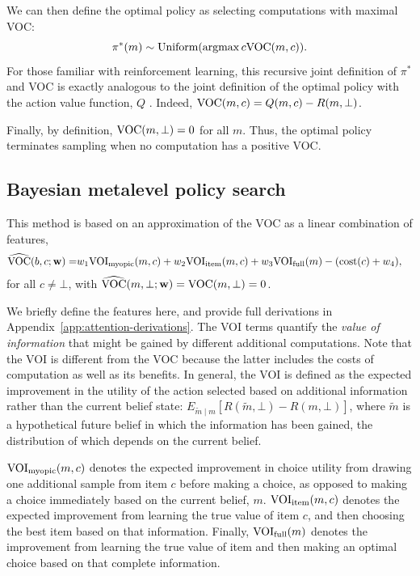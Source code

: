 We can then define the optimal policy as selecting computations with maximal VOC:
$$
\pi^*(m) \sim \text{Uniform}(\operatorname*{argmax}{c} \text{VOC}(m, c)).
$$
For those familiar with reinforcement learning, this recursive joint definition of $\pi^*$ and VOC is exactly analogous to the joint definition of the optimal policy with the action value function, $Q$ \citep{sutton2018reinforcement}. Indeed, $\text{VOC}(m, c) = Q(m, c) - R(m, \bot)$. 

Finally, by definition, $\text{VOC}(m,\bot)=0$ for all $m$. Thus, the optimal policy terminates sampling when no computation has a positive VOC.

\subsection{Bayesian metalevel policy search}\label{sec:BMPS}

This method is based on an approximation of the VOC as a linear combination of features,
\begin{equation}\label{eq:vochat}
  \begin{aligned}
    \widehat{\text{VOC}}(b, c; \mathbf{w}) =& w_{1}\text{VOI}_\text{myopic}(m,c)+w_{2}\text{VOI}_\text{item}(m,c) +
     w_{3}\text{VOI}_\text{full}(m) -(\text{cost}(c)+w_{4}),
  \end{aligned}
\end{equation}
for all $c\neq\bot$, with $\widehat{\text{VOC}}(m, \bot; \mathbf{w}) = \text{VOC}(m,\bot)=0$.

We briefly define the features here, and provide full derivations in Appendix~\ref{app:attention-derivations}. The VOI terms quantify the \textit{value of information} \citep{howard1966information} that might be gained by different additional computations. Note that the VOI is different from the VOC because the latter includes the costs of computation as well as its benefits. In general, the VOI is defined as the expected improvement in the utility of the action selected based on additional information rather than the current belief state: $E_{\tilde{m} \mid m}[R(\tilde{m}, \bot) - R(m, \bot)]$, where $\tilde{m}$ is a hypothetical future belief in which the information has been gained, the distribution of which depends on the current belief.

$\text{VOI}_\text{myopic}(m,c)$ denotes the expected improvement in choice utility from drawing one additional sample from item $c$ before making a choice, as opposed to making a choice immediately based on the current belief, $m$. $\text{VOI}_\text{item}(m,c)$ denotes the expected improvement from learning the true value of item $c$, and then choosing the best item based on that information. Finally, $\text{VOI}_\text{full}(m)$ denotes the improvement from learning the true value of  item and then making an optimal choice based on that complete information.


